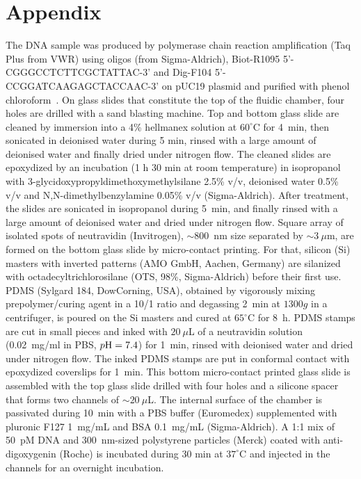 \documentclass[aps,pre,twocolumn]{revtex4}
\begin{document}
\section*{Appendix}
\label{appendix}
The DNA sample was produced by polymerase chain reaction amplification (Taq Plus from VWR) using oligos (from Sigma-Aldrich),  Biot-R1095 5'-CGGGCCTCTTCGCTATTAC-3' and Dig-F104 5'- CCGGATCAAGAGCTACCAAC-3' on pUC19 plasmid and purified with phenol chloroform~\cite{PRL2019}. 
On glass slides that constitute the top of the fluidic chamber, four holes are drilled with a sand blasting machine. Top and bottom glass slide are cleaned by immersion into a 4\% hellmanex solution at $60^\circ$C for 4~min, then sonicated in deionised water during 5 min, rinsed with a large amount of deionised water and finally dried under nitrogen flow. The cleaned slides are epoxydized by an incubation (1 h 30 min at room temperature) in isopropanol with 3-glycidoxypropyldimethoxymethylsilane 2.5\% v/v, deionised water 0.5\% v/v and N,N-dimethylbenzylamine 0.05\% v/v (Sigma-Aldrich). After treatment, the slides are sonicated in isopropanol during 5~min, and finally rinsed with a large amount of deionised water and dried under nitrogen flow. 
Square array of isolated spots of neutravidin (Invitrogen), $\sim800$~nm size separated by $\sim3~\mu$m, are formed on the bottom glass slide by micro-contact printing. For that, silicon (Si) masters with inverted patterns (AMO GmbH, Aachen, Germany) are silanized with octadecyltrichlorosilane (OTS, 98\%, Sigma-Aldrich) before their first use. PDMS (Sylgard 184, DowCorning, USA), obtained by vigorously mixing prepolymer/curing agent in a 10/1 ratio and degassing 2~min at $1300 g$ in a centrifuger, is poured on the Si masters and cured at $65^\circ$C for 8~h. PDMS stamps are cut in small pieces and inked with $20~\mu$L of a neutravidin solution (0.02~mg/ml in PBS, $p{\rm H}=7.4$) for 1~min, rinsed with deionised water and dried under nitrogen flow. The inked PDMS stamps are put in conformal contact with epoxydized coverslips for 1~min. This bottom micro-contact printed glass slide is assembled with the top glass slide drilled with four holes and a silicone spacer that forms two channels of $\sim20~\mu$L.
The internal surface of the chamber is passivated during 10~min with a PBS buffer (Euromedex) supplemented with pluronic F127 1~mg/mL and BSA 0.1~mg/mL (Sigma-Aldrich).  A 1:1 mix of 50~pM DNA and 300~nm-sized polystyrene particles (Merck) coated with anti-digoxygenin (Roche) is incubated during 30 min at $37^\circ$C and injected in the channels for an overnight incubation.
\end{document}
